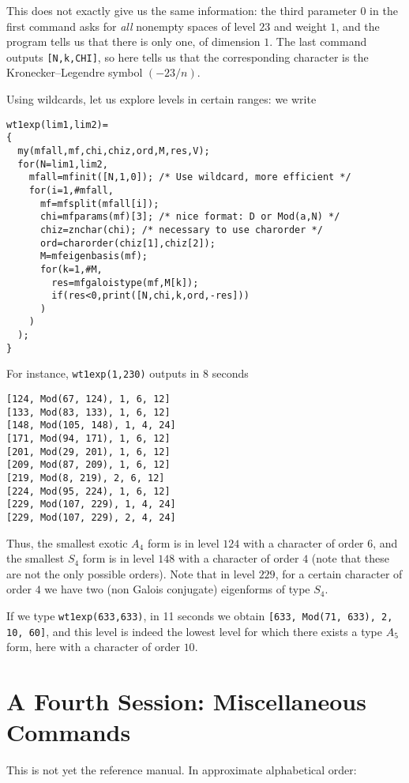 \documentclass[11pt]{article}
\def\kbd#1{{\tt #1}}
\begin{document}
This does not exactly give us the same information: the third parameter $0$
in the first command asks for \emph{all} nonempty spaces of level $23$ and
weight $1$, and the program tells us that there is only one, of dimension $1$.
The last command outputs \kbd{[N,k,CHI]}, so here tells us that the
corresponding character is the Kronecker--Legendre symbol $(-23/n)$.

Using wildcards, let us explore levels in certain ranges: we write

\begin{verbatim}
wt1exp(lim1,lim2)=
{
  my(mfall,mf,chi,chiz,ord,M,res,V);
  for(N=lim1,lim2,
    mfall=mfinit([N,1,0]); /* Use wildcard, more efficient */
    for(i=1,#mfall,
      mf=mfsplit(mfall[i]);
      chi=mfparams(mf)[3]; /* nice format: D or Mod(a,N) */
      chiz=znchar(chi); /* necessary to use charorder */
      ord=charorder(chiz[1],chiz[2]);
      M=mfeigenbasis(mf);
      for(k=1,#M,
        res=mfgaloistype(mf,M[k]);
        if(res<0,print([N,chi,k,ord,-res]))
      )
    )
  );
}
\end{verbatim}

For instance, \kbd{wt1exp(1,230)} outputs in 8 seconds

\begin{verbatim}
[124, Mod(67, 124), 1, 6, 12]
[133, Mod(83, 133), 1, 6, 12]
[148, Mod(105, 148), 1, 4, 24]
[171, Mod(94, 171), 1, 6, 12]
[201, Mod(29, 201), 1, 6, 12]
[209, Mod(87, 209), 1, 6, 12]
[219, Mod(8, 219), 2, 6, 12]
[224, Mod(95, 224), 1, 6, 12]
[229, Mod(107, 229), 1, 4, 24]
[229, Mod(107, 229), 2, 4, 24]
\end{verbatim}

Thus, the smallest exotic $A_4$ form is in level $124$ with a character
of order $6$, and the smallest $S_4$ form is in level $148$ with a character
of order $4$ (note that these are not the only possible orders). Note that
in level $229$, for a certain character of order $4$ we have two (non Galois
conjugate) eigenforms of type $S_4$.

If we type \kbd{wt1exp(633,633)}, in 11 seconds we obtain
\kbd{[633, Mod(71, 633), 2, 10, 60]}, and this level is indeed the lowest
level for which there exists a type $A_5$ form, here with a character of order
$10$.

\section{A Fourth Session: Miscellaneous Commands}

This is not yet the reference manual. In approximate alphabetical order:
\end{document}
